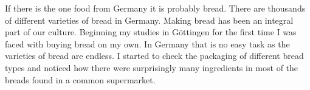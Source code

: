 If there is the one food from Germany it is probably bread. There are thousands
of different varieties of bread in Germany. Making bread has been an integral part
of our culture. Beginning my studies in Göttingen for the first time I was faced
with buying bread on my own. In Germany that is no easy task
as the varieties of bread are endless. I started to check the packaging
of different bread types and noticed how there were surprisingly
many ingredients in most of the breads found in a common supermarket.
